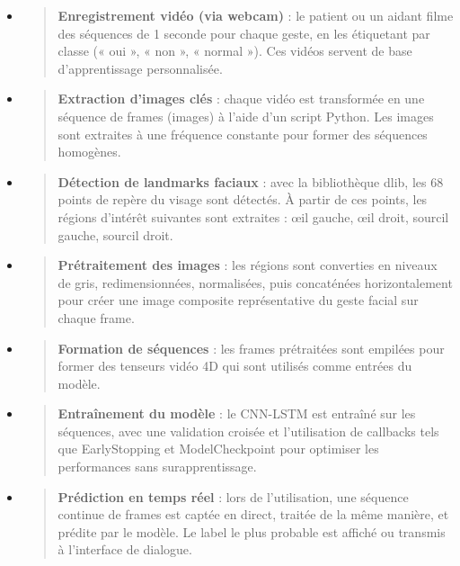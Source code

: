 \documentclass[
]{article}
\begin{document}
\begin{itemize}
\item
  \begin{quote}
  \textbf{Enregistrement vidéo (via webcam)} : le patient ou un aidant filme des séquences de 1 seconde pour chaque geste, en les étiquetant par classe (« oui », « non », « normal »). Ces vidéos servent de base d'apprentissage personnalisée.
  \end{quote}
\item
  \begin{quote}
  \textbf{Extraction d'images clés} : chaque vidéo est transformée en une séquence de frames (images) à l'aide d'un script Python. Les images sont extraites à une fréquence constante pour former des séquences homogènes.
  \end{quote}
\item
  \begin{quote}
  \textbf{Détection de landmarks faciaux} : avec la bibliothèque dlib, les 68 points de repère du visage sont détectés. À partir de ces points, les régions d'intérêt suivantes sont extraites : œil gauche, œil droit, sourcil gauche, sourcil droit.
  \end{quote}
\item
  \begin{quote}
  \textbf{Prétraitement des images} : les régions sont converties en niveaux de gris, redimensionnées, normalisées, puis concaténées horizontalement pour créer une image composite représentative du geste facial sur chaque frame.
  \end{quote}
\item
  \begin{quote}
  \textbf{Formation de séquences} : les frames prétraitées sont empilées pour former des tenseurs vidéo 4D qui sont utilisés comme entrées du modèle.
  \end{quote}
\item
  \begin{quote}
  \textbf{Entraînement du modèle} : le CNN-LSTM est entraîné sur les séquences, avec une validation croisée et l'utilisation de callbacks tels que EarlyStopping et ModelCheckpoint pour optimiser les performances sans surapprentissage.
  \end{quote}
\item
  \begin{quote}
  \textbf{Prédiction en temps réel} : lors de l'utilisation, une séquence continue de frames est captée en direct, traitée de la même manière, et prédite par le modèle. Le label le plus probable est affiché ou transmis à l'interface de dialogue.
  \end{quote}
\end{itemize}
\end{document}

